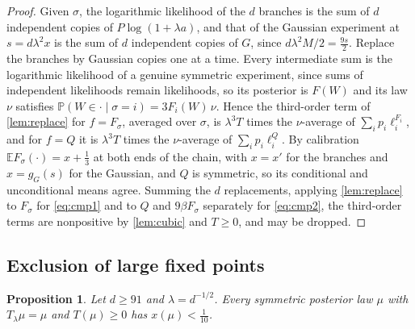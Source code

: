 \documentclass[11pt]{amsart}
\newtheorem{proposition}[theorem]{Proposition}
\theoremstyle{definition}
\theoremstyle{remark}
\newcommand{\E}{\mathbb{E}}
\newcommand{\PP}{\mathbb{P}}
\begin{document}
\begin{proof}
Given $\sigma$, the logarithmic likelihood of the $d$ branches is the sum of $d$ independent copies of
$P\log(1+\lambda a)$, and that of the Gaussian experiment at $s=d\lambda^2x$ is the sum of $d$ independent copies of
$G$, since $d\lambda^2M/2=\tfrac{9s}2$. Replace the branches by Gaussian copies one at a time. Every intermediate
sum is the logarithmic likelihood of a genuine symmetric experiment, since sums of independent likelihoods remain
likelihoods, so its posterior is $F(W)$ and its law $\nu$ satisfies $\PP(W\in\cdot\mid\sigma=i)=3F_i(W)\,\nu$.
Hence the third-order term of \cref{lem:replace} for $f=F_\sigma$, averaged over $\sigma$, is $\lambda^3T$ times
the $\nu$-average of $\sum_ip_i\ell_i^{F_i}$, and for $f=Q$ it is $\lambda^3T$ times the $\nu$-average of
$\sum_ip_i\ell_i^Q$. By calibration $\E F_\sigma(\cdot)=x+\tfrac13$ at both ends of the chain, with $x=x'$ for the
branches and $x=g_G(s)$ for the Gaussian, and $Q$ is symmetric, so its conditional and unconditional means agree.
Summing the $d$ replacements, applying \cref{lem:replace} to $F_\sigma$ for \eqref{eq:cmp1} and to $Q$ and
$9\beta F_\sigma$ separately for \eqref{eq:cmp2}, the third-order terms are nonpositive by \cref{lem:cubic} and
$T\ge0$, and may be dropped.
\end{proof}

\subsection{Exclusion of large fixed points}

\begin{proposition}\label{prop:large}
Let $d\ge91$ and $\lambda=d^{-1/2}$. Every symmetric posterior law $\mu$ with $T_\lambda\mu=\mu$ and $T(\mu)\ge0$
has $x(\mu)<\tfrac1{10}$.
\end{proposition}
\end{document}
